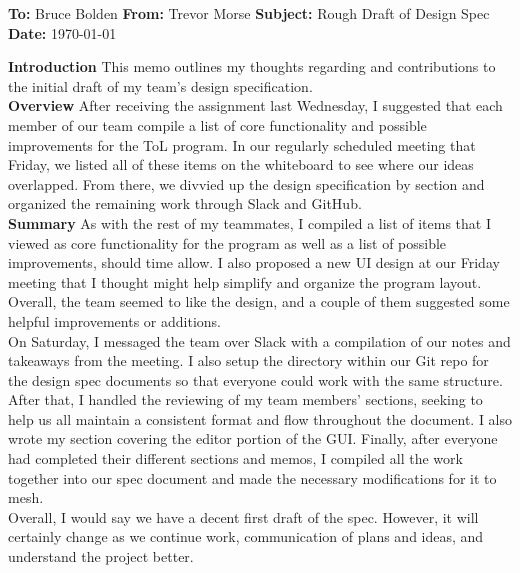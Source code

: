 \documentclass[12pt]{article}
\begin{document}
	\noindent
	\textbf{To:} Bruce Bolden \newline
	\textbf{From:} Trevor Morse\newline
	\textbf{Subject:}  Rough Draft of Design Spec\newline
	\textbf{Date:} \today	\newline\newline
	
	\noindent\textbf{Introduction} \newline
	This memo outlines my thoughts regarding and contributions to the initial draft of my team's design specification.\\
	
	\noindent\textbf{Overview}\newline
	After receiving the assignment last Wednesday, I suggested that each member of our team compile a list of core functionality and possible improvements for the ToL program. In our regularly scheduled meeting that Friday, we listed all of these items on the whiteboard to see where our ideas overlapped. From there, we divvied up the design specification by section and organized the remaining work through Slack and GitHub.\\

	\noindent\textbf{Summary}\newline
	As with the rest of my teammates, I compiled a list of items that I viewed as core functionality for the program as well as a list of possible improvements, should time allow. I also proposed a new UI design at our Friday meeting that I thought might help simplify and organize the program layout. Overall, the team seemed to like the design, and a couple of them suggested some helpful improvements or additions.\\
	
	\noindent On Saturday, I messaged the team over Slack with a compilation of our notes and takeaways from the meeting. I also setup the directory within our Git repo for the design spec documents so that everyone could work with the same structure. After that, I handled the reviewing of my team members' sections, seeking to help us all maintain a consistent format and flow throughout the document. I also wrote my section covering the editor portion of the GUI. Finally, after everyone had completed their different sections and memos, I compiled all the work together into our spec document and made the necessary modifications for it to mesh.\\
	
	\noindent Overall, I would say we have a decent first draft of the spec. However, it will certainly change as we continue work, communication of plans and ideas, and understand the project better.
\end{document}
